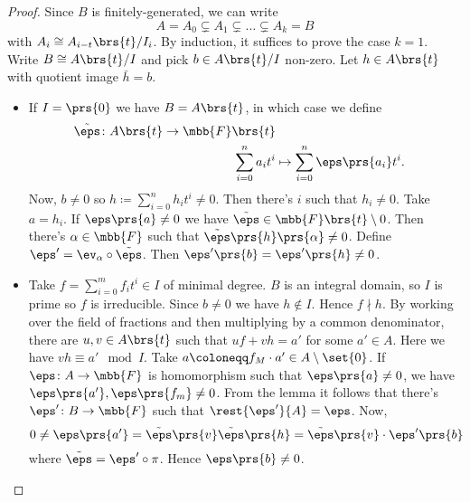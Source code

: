 \documentclass[10pt,a4paper,twoside,openany,hidelinks]{book}
\begin{document}
\begin{proof}
Since $B$ is finitely-generated, we can write
\[A = A_0 \subsetneq A_1 \subsetneq \ldots \subsetneq A_k = B\]
with $A_i \cong A_{i-t}\brs{t} / I_i$.
By induction, it suffices to prove the case $k=1$.
Write $B \cong A\brs{t} / I$ and pick $b \in A\brs{t} / I$ non-zero. Let $h \in A\brs{t}$ with quotient image $\bar{h} = b$.

\begin{itemize}
\item If $I = \prs{0}$ we have $B = A\brs{t}$, in which case we define
\begin{align*}
\tilde{\eps} \colon A\brs{t} \to \mbb{F}\brs{t} \\
\sum_{i=0}^n a_i t^i &\mapsto \sum_{i = 0}^n \eps\prs{a_i} t^i \text{.}
\end{align*}
Now, $b \neq 0$ so $h \coloneqq \sum_{i = 0}^n h_i t^i \neq 0$. Then there's $i$ such that $h_i \neq 0$. Take $a = h_i$. If $\eps\prs{a} \neq 0$ we have $\tilde{\eps} \in \mbb{F}\brs{t} \setminus 0$. Then there's $\alpha \in \mbb{F}$ such that $\tilde{\eps}\prs{h}\prs{\alpha} \neq 0$. Define $\eps' = \ev_\alpha \circ \tilde{\eps}$.
Then $\eps'\prs{b} = \eps'\prs{h} \neq 0$. 

\item %
Take $f = \sum_{i = 0}^m f_i t^i \in I$ of minimal degree. $B$ is an integral domain, so $I$ is prime so $f$ is irreducible. Since $b \neq 0$ we have $h \notin I$. Hence $f \nmid h$. By working over the field of fractions and then multiplying by a common denominator, there are $u,v \in A\brs{t}$ such that $uf + vh = a'$ for some $a' \in A$. Here we have $vh \equiv a' \mod{I}$.
Take $a \coloneqq f_M \cdot a' \in A \setminus \set{0}$. If $\eps \colon A \to \mbb{F}$ is homomorphism such that $\eps\prs{a} \neq 0$, we have $\eps\prs{a'}, \eps\prs{f_m} \neq 0$. From the lemma it follows that there's $\eps' \colon B \to \mbb{F}$ such that $\rest{\eps'}{A} = \eps$. Now,
\[0 \neq \eps\prs{a'} = \tilde{\eps}\prs{v} \tilde{\eps}\prs{h} = \tilde{\eps}\prs{v} \cdot \eps'\prs{b}\]
where $\tilde{\eps} = \eps' \circ \pi$. Hence $\eps\prs{b} \neq 0$.
\end{itemize}
\end{proof}
\end{document}
